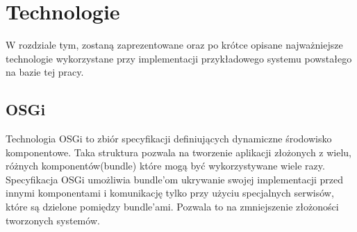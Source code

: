 \ifpdf
    \graphicspath{{3/figures/PNG/}{3/figures/PDF/}{3/figures/}}
\else
    \graphicspath{{3/figures/EPS/}{3/figures/}}
\fi
\chapter{Technologie} %


W rozdziale tym, zostaną zaprezentowane oraz po krótce opisane najważniejsze technologie wykorzystane przy implementacji przykładowego systemu  powstałego na bazie tej pracy.

\section{OSGi}
Technologia OSGi to zbiór specyfikacji definiujących dynamiczne środowisko komponentowe. Taka struktura pozwala na tworzenie aplikacji złożonych z wielu, różnych komponentów(bundle) które mogą być wykorzystywane wiele razy. Specyfikacja OSGi umożliwia bundle'om ukrywanie swojej implementacji przed innymi komponentami i komunikację tylko przy użyciu specjalnych serwisów, które są dzielone pomiędzy bundle'ami. Pozwala to na zmniejszenie złożoności tworzonych systemów.


